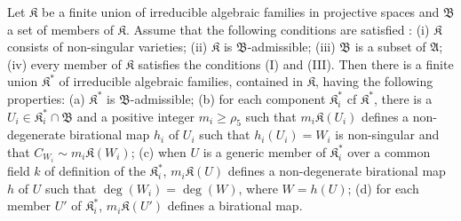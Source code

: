 \begin{lemma}\label{art14-lem17}
Let $\mathfrak{K}$ be a finite union of irreducible algebraic families in projective spaces and $\mathfrak{B}$ a set of members of $\mathfrak{K}$. Assume that the following conditions are satisfied : {\rm(i)} $\mathfrak{K}$ consists of non-singular varieties; {\rm(ii)} $\mathfrak{K}$ is $\mathfrak{B}$-admissible; {\rm(iii)} $\mathfrak{B}$ is a subset of $\mathfrak{A}$; {\rm(iv)} every member of $\mathfrak{K}$ satisfies the conditions {\rm(I)} and {\rm(III)}. Then there is a finite union $\mathfrak{K}^{*}$ of irreducible algebraic families, contained in $\mathfrak{K}$, having the following properties: {\rm(a)} $\mathfrak{K}^{*}$ is $\mathfrak{B}$-admissible; {\rm(b)} for each component $\mathfrak{K}^{*}_{i}$ cf $\mathfrak{K}^{*}$, there is a $U_{i}\in \mathfrak{K}^{*}_{i}\cap \mathfrak{B}$ and a positive integer $m_{i}\geq \rho_{5}$ such that $m_{i}\mathfrak{K}(U_{i})$ defines a non-degenerate birational map $h_{i}$ of $U_{i}$ such that $h_{i}(U_{i})=W_{i}$ is non-singular and that $C_{W_{i}}\sim m_{i}\mathfrak{K}(W_{i})$; {\rm(c)} when $U$ is a generic member of $\mathfrak{K}^{*}_{i}$ over a common field $k$ of definition of the $\mathfrak{K}^{*}_{i}$, $m_{i}\mathfrak{K}(U)$ defines a non-degenerate birational map $h$ of $U$ such that $\deg(W_{i})=\deg(W)$, where $W=h(U)$; {\rm(d)} for each member $U'$ of $\mathfrak{K}^{*}_{i}$, $m_{i}\mathfrak{K}(U')$ defines a birational map.
\end{lemma}


